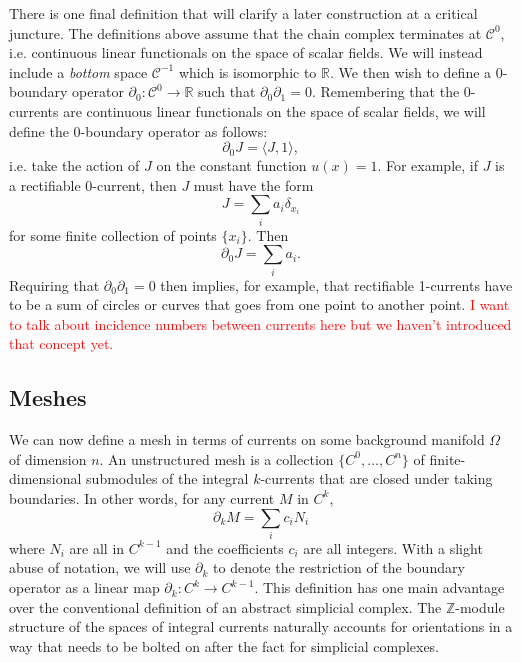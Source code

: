 \documentclass[twocolumn]{article}
\begin{document}
There is one final definition that will clarify a later construction at a critical juncture.
The definitions above assume that the chain complex terminates at $\mathscr{C}^0$, i.e. continuous linear functionals on the space of scalar fields.
We will instead include a \emph{bottom} space $\mathscr{C}^{-1}$ which is isomorphic to $\mathbb{R}$.
We then wish to define a 0-boundary operator $\partial_0 : \mathscr{C}^0 \to \mathbb{R}$ such that $\partial_0\partial_1 = 0$.
Remembering that the 0-currents are continuous linear functionals on the space of scalar fields, we will define the 0-boundary operator as follows:
\begin{equation}
    \partial_0 J = \langle J, 1\rangle,
    \label{eq:0-boundary-operator}
\end{equation}
i.e. take the action of $J$ on the constant function $u(x) = 1$.
For example, if $J$ is a rectifiable 0-current, then $J$ must have the form
\begin{equation}
    J = \sum_ia_i\delta_{x_i}
\end{equation}
for some finite collection of points $\{x_i\}$.
Then
\begin{equation}
    \partial_0J = \sum_i a_i.
\end{equation}
Requiring that $\partial_0\partial_1 = 0$ then implies, for example, that rectifiable 1-currents have to be a sum of circles or curves that goes from one point to another point.
\textcolor{red}{I want to talk about incidence numbers between currents here but we haven't introduced that concept yet.}

\subsection{Meshes}

We can now define a mesh in terms of currents on some background manifold $\Omega$ of dimension $n$.
An unstructured mesh is a collection $\{C^0, \ldots, C^n\}$ of finite-dimensional submodules of the integral $k$-currents that are closed under taking boundaries.
In other words, for any current $M$ in $C^k$,
\begin{equation}
    \partial_k M = \sum_ic_iN_i
\end{equation}
where $N_i$ are all in $C^{k - 1}$ and the coefficients $c_i$ are all integers.
With a slight abuse of notation, we will use $\partial_k$ to denote the restriction of the boundary operator as a linear map $\partial_k : C^k \to C^{k - 1}$.
This definition has one main advantage over the conventional definition of an abstract simplicial complex.
The $\mathbb{Z}$-module structure of the spaces of integral currents naturally accounts for orientations in a way that needs to be bolted on after the fact for simplicial complexes.
\end{document}
